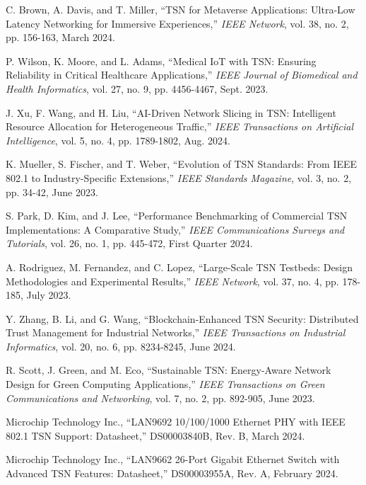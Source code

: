 \documentclass[10pt, journal, compsoc]{IEEEtran}
\begin{document}
\begin{thebibliography}{99}
C. Brown, A. Davis, and T. Miller, ``TSN for Metaverse Applications: Ultra-Low Latency Networking for Immersive Experiences,'' \textit{IEEE Network}, vol. 38, no. 2, pp. 156-163, March 2024.

P. Wilson, K. Moore, and L. Adams, ``Medical IoT with TSN: Ensuring Reliability in Critical Healthcare Applications,'' \textit{IEEE Journal of Biomedical and Health Informatics}, vol. 27, no. 9, pp. 4456-4467, Sept. 2023.

J. Xu, F. Wang, and H. Liu, ``AI-Driven Network Slicing in TSN: Intelligent Resource Allocation for Heterogeneous Traffic,'' \textit{IEEE Transactions on Artificial Intelligence}, vol. 5, no. 4, pp. 1789-1802, Aug. 2024.

K. Mueller, S. Fischer, and T. Weber, ``Evolution of TSN Standards: From IEEE 802.1 to Industry-Specific Extensions,'' \textit{IEEE Standards Magazine}, vol. 3, no. 2, pp. 34-42, June 2023.

S. Park, D. Kim, and J. Lee, ``Performance Benchmarking of Commercial TSN Implementations: A Comparative Study,'' \textit{IEEE Communications Surveys and Tutorials}, vol. 26, no. 1, pp. 445-472, First Quarter 2024.

A. Rodriguez, M. Fernandez, and C. Lopez, ``Large-Scale TSN Testbeds: Design Methodologies and Experimental Results,'' \textit{IEEE Network}, vol. 37, no. 4, pp. 178-185, July 2023.

Y. Zhang, B. Li, and G. Wang, ``Blockchain-Enhanced TSN Security: Distributed Trust Management for Industrial Networks,'' \textit{IEEE Transactions on Industrial Informatics}, vol. 20, no. 6, pp. 8234-8245, June 2024.

R. Scott, J. Green, and M. Eco, ``Sustainable TSN: Energy-Aware Network Design for Green Computing Applications,'' \textit{IEEE Transactions on Green Communications and Networking}, vol. 7, no. 2, pp. 892-905, June 2023.

Microchip Technology Inc., ``LAN9692 10/100/1000 Ethernet PHY with IEEE 802.1 TSN Support: Datasheet,'' DS00003840B, Rev. B, March 2024.

Microchip Technology Inc., ``LAN9662 26-Port Gigabit Ethernet Switch with Advanced TSN Features: Datasheet,'' DS00003955A, Rev. A, February 2024.


\end{thebibliography}
\end{document}
